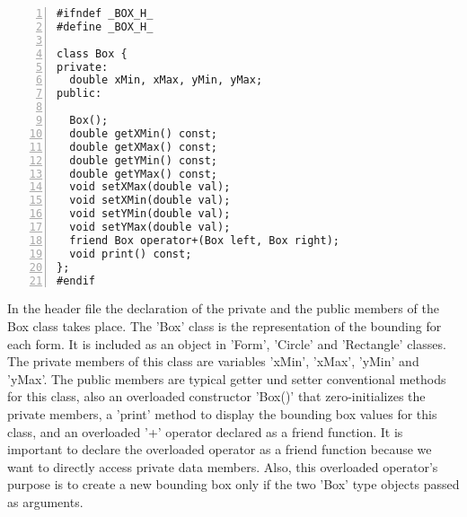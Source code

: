 \documentclass{article}
\begin{document}
\begin{lstlisting}[basicstyle=\footnotesize\ttfamily, numbers=left, stepnumber=1, numberstyle = \normalsize, caption={My Caption}]
#ifndef _BOX_H_
#define _BOX_H_

class Box {
private:
  double xMin, xMax, yMin, yMax;
public:

  Box();
  double getXMin() const;
  double getXMax() const;
  double getYMin() const;
  double getYMax() const;
  void setXMax(double val);
  void setXMin(double val);
  void setYMin(double val);
  void setYMax(double val);
  friend Box operator+(Box left, Box right);
  void print() const;
};
#endif
\end{lstlisting}
\normalsize{In the header file the declaration of the private and the public members of the Box class takes place.\newline
  \newline
  The 'Box' class is the representation of the bounding for each form. It is included as an object in 'Form', 'Circle' and 'Rectangle' classes.
  The private members of this class are variables 'xMin', 'xMax', 'yMin' and 'yMax'.
  The public members are typical getter und setter conventional methods for this class, also an overloaded constructor 'Box()' that zero-initializes the private members, a 'print' method to display the bounding box values for this class, and an overloaded '+' operator declared as a friend function. It is important to declare the overloaded operator as a friend function because we want to directly access private data members.
  Also, this overloaded operator's purpose is to create a new bounding box only if the two 'Box' type objects passed as arguments.

}\newpage
\end{document}
